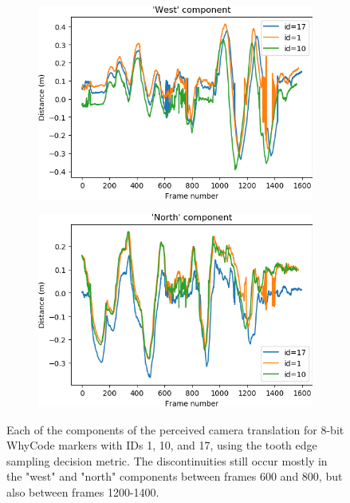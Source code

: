 \begin{figure}
    \begin{subfigure}[b]{0.49\textwidth}
         \centering
         \includegraphics[width=\textwidth]{images/ellipse_sampling.csv_figure_w}
    \end{subfigure}
    \hfill
    \begin{subfigure}[b]{0.49\textwidth}
         \centering
         \includegraphics[width=\textwidth]{images/ellipse_sampling.csv_figure_n}
    \end{subfigure}

    \caption{Each of the components of the perceived camera translation for 8-bit WhyCode markers with IDs 1, 10, and 17, using the tooth edge sampling decision metric.
    The discontinuities still occur mostly in the "west" and "north" components between frames 600 and 800, but also between frames 1200-1400.}
    \label{figure:ellipse_sampling_uwn}
\end{figure}

